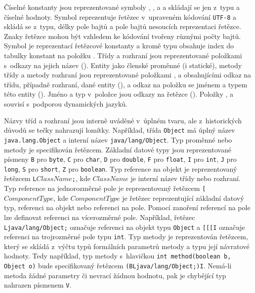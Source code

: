  Číselné konstanty jsou reprezentované symboly , ,  a  a skládají se jen z~typu a číselné hodnoty. 
Symbol  reprezentuje řetězec v~upraveném kódování \texttt{UTF-8} a skládá se z~typu, délky pole bajtů a pole bajtů nesoucích reprezentaci řetězce. Znaky řetězce mohou být vzhledem ke kódování tvořeny různými počty bajtů. 
Symbol  je reprezentací řetězcové konstanty a kromě typu obsahuje index do tabulky konstant na položku . 
Třídy a rozhraní jsou reprezentované položkami  s~odkazy na jejich název (). 
Entity jako členské proměnné (i statické), metody třídy a metody rozhraní jsou reprezentované položkami ,  a  obsahujícími odkaz na třídu, případně rozhraní, dané entity (), a odkaz na položku se jménem a typem této entity (). 
Jméno a typ v~položce  jsou odkazy na řetězce (). 
Položky ,  a  souvisí s~podporou dynamických jazyků.


Názvy tříd a rozhraní jsou interně uváděné v~úplném tvaru, ale z~historických důvodů se tečky nahrazují lomítky. Například, třída \texttt{Object} má úplný název \texttt{java.lang.Object} a interní název \texttt{java/lang/Object}. Typ proměnné nebo metody je specifikován řetězcem. Základní datové typy jsou reprezentované písmeny \texttt{B} pro \texttt{byte}, \texttt{C} pro \texttt{char}, \texttt{D} pro \texttt{double}, \texttt{F} pro \texttt{float}, \texttt{I} pro \texttt{int}, \texttt{J} pro \texttt{long}, \texttt{S} pro \texttt{short}, \texttt{Z} pro \texttt{boolean}. Typ reference na objekt je reprezentovaný řetězcem \texttt{L}$ClassName$\texttt{;}, kde $ClassName$ je interní název třídy nebo rozhraní. Typ reference na jednorozměrné pole je reprezentovaný řetězcem \texttt{[}$ComponentType$, kde $ComponentType$ je řetězec reprezentující základní datový typ, referenci na objekt nebo referenci na pole. Pomocí zanoření referencí na pole lze definovat referenci na vícerozměrné pole. Například, řetězec \texttt{Ljava/lang/Object;} označuje referenci na objekt typu \texttt{Object} a \texttt{[[[I} označuje referenci na trojrozměrné pole typu \texttt{int}. Typ metody je reprezentován řetězcem, který se skládá z~výčtu typů formálních parametrů metody a typu její návratové hodnoty. Tedy například, typ metody s~hlavičkou \texttt{int method(boolean b, Object o)} bude specifikovaný řetězcem \texttt{(BLjava/lang/Object;)I}. Nemá-li metoda žádné parametry či nevrací žádnou hodnotu, pak je chybějící typ nahrazen písmenem \texttt{V}.


